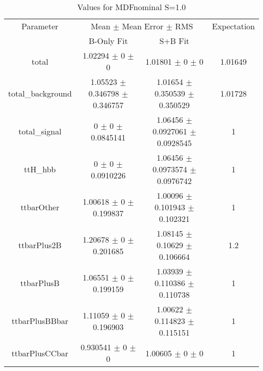 \begin{table}
\centering
\caption{Values for MDFnominal S=1.0}
\begin{tabular}{cccc}
\toprule
Parameter & \multicolumn{2}{c}{Mean $\pm$ Mean Error $\pm$ RMS} & Expectation\\
 & B-Only Fit & S+B Fit & \\
\midrule
total & \num{1.02294} $\pm$ \num{0} $\pm$ \num{0} & \num{1.01801} $\pm$ \num{0} $\pm$ \num{0} & \num{1.01649}\\
total\_background & \num{1.05523} $\pm$ \num{0.346798} $\pm$ \num{0.346757} & \num{1.01654} $\pm$ \num{0.350539} $\pm$ \num{0.350529} & \num{1.01728}\\
total\_signal & \num{0} $\pm$ \num{0} $\pm$ \num{0.0845141} & \num{1.06456} $\pm$ \num{0.0927061} $\pm$ \num{0.0928545} & \num{1}\\
ttH\_hbb & \num{0} $\pm$ \num{0} $\pm$ \num{0.0910226} & \num{1.06456} $\pm$ \num{0.0973574} $\pm$ \num{0.0976742} & \num{1}\\
ttbarOther & \num{1.00618} $\pm$ \num{0} $\pm$ \num{0.199837} & \num{1.00096} $\pm$ \num{0.101943} $\pm$ \num{0.102321} & \num{1}\\
ttbarPlus2B & \num{1.20678} $\pm$ \num{0} $\pm$ \num{0.201685} & \num{1.08145} $\pm$ \num{0.10629} $\pm$ \num{0.106664} & \num{1.2}\\
ttbarPlusB & \num{1.06551} $\pm$ \num{0} $\pm$ \num{0.199159} & \num{1.03939} $\pm$ \num{0.110386} $\pm$ \num{0.110738} & \num{1}\\
ttbarPlusBBbar & \num{1.11059} $\pm$ \num{0} $\pm$ \num{0.196903} & \num{1.00622} $\pm$ \num{0.114823} $\pm$ \num{0.115151} & \num{1}\\
ttbarPlusCCbar & \num{0.930541} $\pm$ \num{0} $\pm$ \num{0} & \num{1.00605} $\pm$ \num{0} $\pm$ \num{0} & \num{1}\\
\bottomrule
\end{tabular}
\end{table}